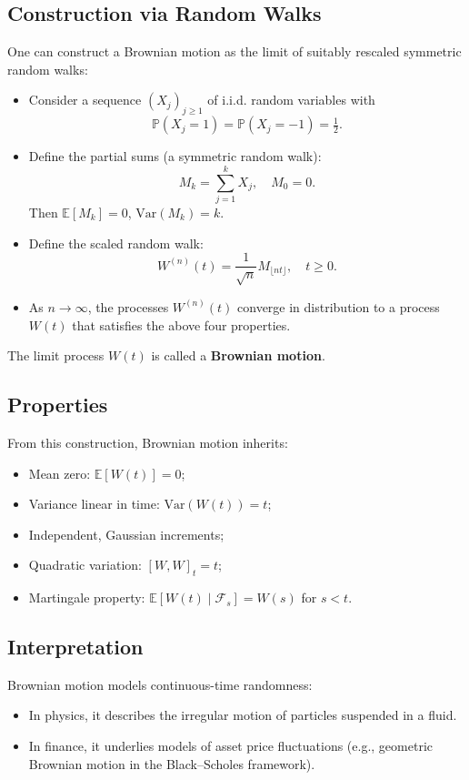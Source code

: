 \documentclass[12pt,a4paper]{book}
\theoremstyle{remark}
\newcommand{\PP}{\mathbb{P}}          %
\newcommand{\EE}{\mathbb{E}}          %
\newcommand{\F}{\mathcal{F}}          %
\newcommand{\Var}{\mathrm{Var}}       %
\begin{document}
\subsection*{Construction via Random Walks}
One can construct a Brownian motion as the limit of suitably rescaled symmetric random walks:

\begin{itemize}
    \item Consider a sequence $(X_j)_{j\geq 1}$ of i.i.d. random variables with
    \[
        \PP(X_j = 1) = \PP(X_j = -1) = \tfrac{1}{2}.
    \]
    \item Define the partial sums (a symmetric random walk):
    \[
        M_k = \sum_{j=1}^k X_j, \quad M_0 = 0.
    \]
    Then $\EE[M_k] = 0$, $\Var(M_k) = k$.
    \item Define the scaled random walk:
    \[
        W^{(n)}(t) = \frac{1}{\sqrt{n}} M_{\lfloor nt \rfloor}, \quad t \geq 0.
    \]
    \item As $n \to \infty$, the processes $W^{(n)}(t)$ converge in distribution to a process $W(t)$ that satisfies the above four properties.
\end{itemize}

The limit process $W(t)$ is called a \textbf{Brownian motion}.

\subsection*{Properties}
From this construction, Brownian motion inherits:
\begin{itemize}
    \item Mean zero: $\EE[W(t)] = 0$;
    \item Variance linear in time: $\Var(W(t)) = t$;
    \item Independent, Gaussian increments;
    \item Quadratic variation: $[W,W]_t = t$;
    \item Martingale property: $\EE[W(t) \mid \F_s] = W(s)$ for $s < t$.
\end{itemize}

\subsection*{Interpretation}
Brownian motion models continuous-time randomness:
\begin{itemize}
    \item In physics, it describes the irregular motion of particles suspended in a fluid.
    \item In finance, it underlies models of asset price fluctuations (e.g., geometric Brownian motion in the Black--Scholes framework).
\end{itemize}
\end{document}
